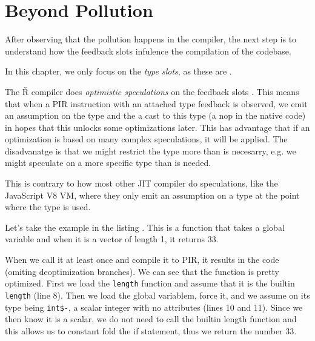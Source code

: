 \chapter{Beyond Pollution}


\begin{chapterabstract}
	\todoadd
\end{chapterabstract}

After observing that the pollution happens in the compiler, the next step is to understand how the feedback slots infulence the compilation of the codebase.


In this chapter, we only focus on the \textit{type slots}, as these are .

The Ř compiler does \textit{optimistic speculations} on the feedback slots . This means that when a PIR instruction with an attached type feedback is observed, we emit an assumption on the type and the a cast to this type (a nop in the native code) in hopes that this unlocks some optimizations later. This has advantage that if an optimization is based on many complex speculations, it will be applied. The disadvanatge is that we might restrict the type more than is necesarry, e.g. we might speculate on a more specific type than is needed.

This is contrary to how most other JIT compiler do speculations, like the JavaScript V8 VM\todocite, where they only emit an assumption on a type at the point where the type is used.


Let's take the example in the listing \todoadd. This is a function that takes a global variable and when it is a vector of length 1, it returns 33.

When we call it at least once and compile it to PIR, it results in the code \todoadd (omiting deoptimization branches). We can see that the function is pretty optimized. First we load the \texttt{length} function and assume that it is the builtin \texttt{length} (line 8). Then we load the global variablem, force it, and we assume on its type being \texttt{int\$-}, a scalar integer with no attributes (lines 10 and 11). Since we then know it is a scalar, we do not need to call the builtin length function and this allows us to constant fold the if statement, thus we return the number 33.

